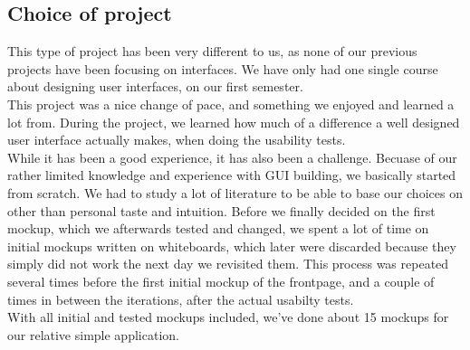 \subsection{Choice of project}
This type of project has been very different to us, as none of our previous projects have been focusing on interfaces. We have only had one single course about designing user interfaces, on our first semester. \\
This project was a nice change of pace, and something we enjoyed and learned a lot from. During the project, we learned how much of a difference a well designed user interface actually makes, when doing the usability tests.\\
While it has been a good experience, it has also been a challenge. Becuase of our rather limited knowledge and experience with GUI building, we basically started from scratch. We had to study a lot of literature to be able to base our choices on other than personal taste and intuition. Before we finally decided on the first mockup, which we afterwards tested and changed, we spent a lot of time on initial mockups written on whiteboards, which later were discarded because they simply did not work the next day we revisited them. This process was repeated several times before the first initial mockup of the frontpage, and a couple of times in between the iterations, after the actual usabilty tests.\\ With all initial and tested mockups included, we've done about 15 mockups for our relative simple application.